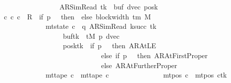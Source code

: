 \begin{isabellebody}
\ \ \ \ \ \ \ \ \ \ \ \ \ \ \ \ \ \ \ {\isacharparenleft}{\kern0pt}AR{\isacharunderscore}{\kern0pt}SimRead{\isacharcomma}{\kern0pt}\ tk{\isacharcomma}{\kern0pt}\ {}{\isacharcomma}{\kern0pt}\ buf{\isacharcomma}{\kern0pt}\ dvec{\isacharcomma}{\kern0pt}\ posk{\isacharparenright}{\kern0pt}{\isachardoublequoteclose}\isanewline
\ \ \ {\isachardoublequoteopen}{\isasymexists}c{\isacharprime}{\kern0pt}{\isacharprime}{\kern0pt}{\isachardot}{\kern0pt}\ {\isacharparenleft}{\kern0pt}c{\isacharprime}{\kern0pt}{\isacharcomma}{\kern0pt}\ c{\isacharprime}{\kern0pt}{\isacharprime}{\kern0pt}{\isacharparenright}{\kern0pt}\ {\isasymin}\ R{\isacharprime}{\kern0pt}\ {\isacharcircum}{\kern0pt}{\isacharcircum}{\kern0pt}\ {\isacharparenleft}{\kern0pt}if\ p\ {\isacharequal}{\kern0pt}\ {}\ then\ {}\ else\ block{\isacharunderscore}{\kern0pt}width\ {\isacharparenleft}{\kern0pt}{\isasymGamma}{\isacharunderscore}{\kern0pt}tm\ M{\isacharparenright}{\kern0pt}\ {\isacharplus}{\kern0pt}\ {}{\isacharparenright}{\kern0pt}\isanewline
\ \ \ \ \ \ \ \ \ \ \ \ \ \ {\isasymand}\ mt{\isacharunderscore}{\kern0pt}state\ c{\isacharprime}{\kern0pt}{\isacharprime}{\kern0pt}\ {\isacharequal}{\kern0pt}\ {\isacharparenleft}{\kern0pt}q{\isacharcomma}{\kern0pt}\ AR{\isacharunderscore}{\kern0pt}SimRead{\isacharcomma}{\kern0pt}\ k{\isacharunderscore}{\kern0pt}succ\ tk{\isacharcomma}{\kern0pt}\ {}{\isacharcomma}{\kern0pt}\isanewline
\ \ \ \ \ \ \ \ \ \ \ \ \ \ \ \ \ \ \ \ buf{\isacharparenleft}{\kern0pt}tk\ {\isacharcolon}{\kern0pt}{\isacharequal}{\kern0pt}\ tM\ p{\isacharparenright}{\kern0pt}{\isacharcomma}{\kern0pt}\ dvec{\isacharcomma}{\kern0pt}\isanewline
\ \ \ \ \ \ \ \ \ \ \ \ \ \ \ \ \ \ \ \ posk{\isacharparenleft}{\kern0pt}tk\ {\isacharcolon}{\kern0pt}{\isacharequal}{\kern0pt}\ if\ p\ {\isacharequal}{\kern0pt}\ {}\ then\ AR{\isacharunderscore}{\kern0pt}AtLE\isanewline
\ \ \ \ \ \ \ \ \ \ \ \ \ \ \ \ \ \ \ \ \ \ \ \ \ \ \ \ \ \ \ else\ if\ p\ {\isacharequal}{\kern0pt}\ {}\ then\ AR{\isacharunderscore}{\kern0pt}AtFirstProper\isanewline
\ \ \ \ \ \ \ \ \ \ \ \ \ \ \ \ \ \ \ \ \ \ \ \ \ \ \ \ \ \ \ else\ AR{\isacharunderscore}{\kern0pt}AtFurtherProper{\isacharparenright}{\kern0pt}{\isacharparenright}{\kern0pt}\isanewline
\ \ \ \ \ \ \ \ \ \ \ \ \ \ {\isasymand}\ mt{\isacharunderscore}{\kern0pt}tape\ c{\isacharprime}{\kern0pt}{\isacharprime}{\kern0pt}\ {\isacharequal}{\kern0pt}\ mt{\isacharunderscore}{\kern0pt}tape\ c{\isacharprime}{\kern0pt}\isanewline
\ \ \ \ \ \ \ \ \ \ \ \ \ \ {\isasymand}\ mt{\isacharunderscore}{\kern0pt}pos\ c{\isacharprime}{\kern0pt}{\isacharprime}{\kern0pt}\ {\isacharequal}{\kern0pt}\ {\isacharparenleft}{\kern0pt}mt{\isacharunderscore}{\kern0pt}pos\ c{\isacharprime}{\kern0pt}{\isacharparenright}{\kern0pt}{\isacharparenleft}{\kern0pt}tk\ {\isacharcolon}{\kern0pt}{\isacharequal}{\kern0pt}\isanewline

\end{isabellebody}
